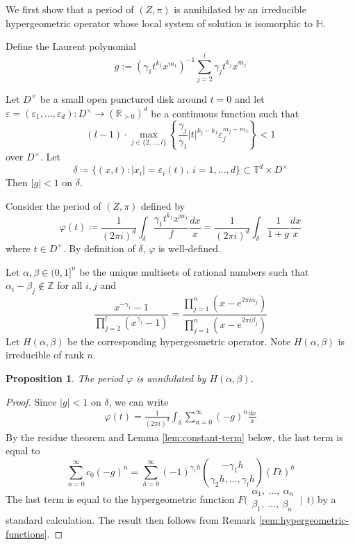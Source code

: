\documentclass[11pt, reqno]{amsart}
\theoremstyle{plain}
\newtheorem{prop}[thm]{Proposition}
\theoremstyle{definition}
\newcommand{\Z}{\mathbb{Z}}
\newcommand{\RR}{\mathbb{R}}
\newcommand{\HH}{\mathbb{H}}
\newcommand{\TT}{\mathbb{T}}
\newcommand{\ga}{\gamma}
\begin{document}
We first show that a period of $(Z,\pi)$ is annihilated by an irreducible hypergeometric operator whose local system of solution is isomorphic to $\HH$. 

Define the Laurent polynomial
\begin{equation}
g:=(\gamma_1 t^{k_1} x^{m_1})^{-1} \sum_{j=2}^{l} \gamma_j t^{k_j} x^{m_j}
\end{equation}



Let $D^\times$ be a small open punctured disk around $t=0$  and let  $\varepsilon=(\varepsilon_1, \dots, \varepsilon_d)\colon D^\times \to ({\RR_{>0}})^d$  be a continuous function
such that
\[
(l-1) \cdot \max_{j\in \{2, \dots, l\}} \left\{ \frac{\gamma_j}{\gamma_1} |t|^{k_j-k_1} \varepsilon_j^{m_j-m_1} \right\} <1 
\]
over $D^\times$.
Let
\begin{equation}
\delta \coloneqq \{ (x,t) \colon |x_i|=\varepsilon_i(t), \ i=1, \dots, d \} \subset \TT^{d} \times D^\times 
\end{equation} 
Then $|g|<1$ on $\delta$. 

Consider the period of $(Z, \pi)$ defined by
\begin{equation}
    \varphi(t) \coloneqq \frac{1}{(2\pi i)^d} \int_{\delta} \frac{\gamma_1t^{k_1}x^{m_1}}{f} \frac{dx}{x}= \frac{1}{(2\pi i)^d} \int_{\delta} \frac{1}{1+g} \frac{dx}{x}
\end{equation}
where $t \in D^\times$.
By definition of $\delta$, $\varphi$ is well-defined.

Let $\alpha, \beta \in (0,1]^n$ be the unique multisets of rational numbers such that  $\alpha_i - \beta_j \notin \Z$ for all $i, j$ and 
\begin{equation}
\label{eq:gamma-parameters}
\frac{x^{-\ga_1}-1}{\prod_{j=2}^{l}( x^{\gamma_j} -1)} =  \frac{ \prod_{j=1}^{n} (x- e^{2 \pi i \alpha_j} ) }{ \prod_{j=1}^{n} (x- e^{2 \pi i \beta_j} ) }
\end{equation}
Let $H(\alpha, \beta)$ be the corresponding hypergeometric operator. Note $H(\alpha, \beta)$ is irreducible of rank $n$. 
\begin{prop}
The period $\varphi$ is annihilated by $H(\alpha, \beta)$.
\end{prop}
\begin{proof}
Since $|g| <1$ on $\delta$, we can write 
\begin{align*}
  \varphi(t) = \frac{1}{(2\pi i)^d} \int_\delta \sum_{n=0}^\infty (-g)^n \frac{dx}{x}
\end{align*}
By the residue theorem and Lemma \ref{lem:constant-term} below, the last term is equal to 
\[
\sum_{n=0}^\infty c_{\underline{0}}(-g)^n = \sum_{h=0}^\infty (-1)^{ \ga_1 h} \binom{-\ga_1 h} {\ga_2 h,  \dots ,  \ga_l h }(\Gamma t)^{h}
\]
The last term is equal to the hypergeometric function
$F\biggl(\begin{matrix} \alpha_1, \ \ldots, \ \alpha_n \\ \beta_1, \ \ldots, \ \beta_n \end{matrix} \:\bigg|\:\: t \biggr)$ by a standard calculation. The result then follows from Remark \ref{rem:hypergeometric-functions}. 
\end{proof}
\end{document}
